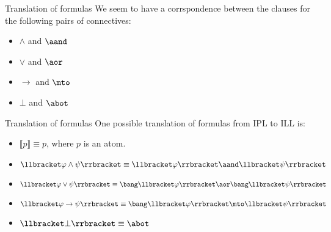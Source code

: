 \documentclass{beamer}
\begin{document}
\begin{frame}{Translation of formulas}
	We seem to have a corrspondence between the clauses for the following pairs of connectives:
	\begin{center}
		\begin{itemize}
			\item $\land$ and $\aand$
			\item $\lor$ and $\aor$
			\item $\to$ and $\mto$
			\item $\bot$ and $\abot$
		\end{itemize}
	\end{center}
\end{frame}
\begin{frame}{Translation of formulas}
	One possible translation of formulas from IPL to ILL is:
	\begin{center}
	\begin{itemize}
        \item $\llbracket p\rrbracket \equiv p$, where $p$ is an atom.
        \item $\llbracket\varphi\land\psi\rrbracket \equiv \llbracket \varphi \rrbracket \aand \llbracket \psi \rrbracket$ 
        \item $\llbracket\varphi \lor\psi\rrbracket \equiv \bang\llbracket \varphi \rrbracket \aor \bang\llbracket \psi \rrbracket$ 
        \item $\llbracket\varphi \to \psi\rrbracket \equiv \bang\llbracket \varphi \rrbracket \mto \llbracket \psi \rrbracket$
        \item $\llbracket\bot\rrbracket \equiv \abot$
	\end{itemize}
	\end{center}
\end{frame}
\end{document}
